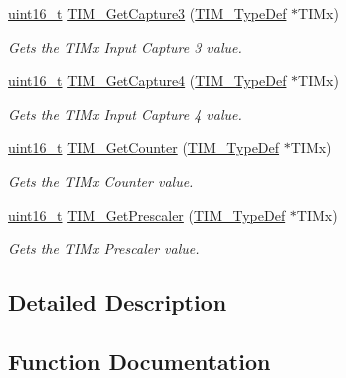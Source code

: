 \begin{DoxyCompactItemize}
\hyperlink{_p_e___types_8h_a1f1825b69244eb3ad2c7165ddc99c956}{uint16\+\_\+t} \hyperlink{group___t_i_m___exported___functions_gab71d1d3d8a15f3be9e74dca51fcca5fa}{T\+I\+M\+\_\+\+Get\+Capture3} (\hyperlink{struct_t_i_m___type_def}{T\+I\+M\+\_\+\+Type\+Def} $\ast$T\+I\+Mx)
\begin{DoxyCompactList}\small\item\em Gets the T\+I\+Mx Input Capture 3 value. \end{DoxyCompactList}\item 
\hyperlink{_p_e___types_8h_a1f1825b69244eb3ad2c7165ddc99c956}{uint16\+\_\+t} \hyperlink{group___t_i_m___exported___functions_ga09049af04c8345849c6f82ccfae242a6}{T\+I\+M\+\_\+\+Get\+Capture4} (\hyperlink{struct_t_i_m___type_def}{T\+I\+M\+\_\+\+Type\+Def} $\ast$T\+I\+Mx)
\begin{DoxyCompactList}\small\item\em Gets the T\+I\+Mx Input Capture 4 value. \end{DoxyCompactList}\item 
\hyperlink{_p_e___types_8h_a1f1825b69244eb3ad2c7165ddc99c956}{uint16\+\_\+t} \hyperlink{group___t_i_m___exported___functions_gab6826b144ae70e206f51ae8af5318a93}{T\+I\+M\+\_\+\+Get\+Counter} (\hyperlink{struct_t_i_m___type_def}{T\+I\+M\+\_\+\+Type\+Def} $\ast$T\+I\+Mx)
\begin{DoxyCompactList}\small\item\em Gets the T\+I\+Mx Counter value. \end{DoxyCompactList}\item 
\hyperlink{_p_e___types_8h_a1f1825b69244eb3ad2c7165ddc99c956}{uint16\+\_\+t} \hyperlink{group___t_i_m___exported___functions_ga427eb6e533480e02a27cd0ca876183d6}{T\+I\+M\+\_\+\+Get\+Prescaler} (\hyperlink{struct_t_i_m___type_def}{T\+I\+M\+\_\+\+Type\+Def} $\ast$T\+I\+Mx)
\begin{DoxyCompactList}\small\item\em Gets the T\+I\+Mx Prescaler value. \end{DoxyCompactList}\end{DoxyCompactItemize}


\subsection{Detailed Description}


\subsection{Function Documentation}
